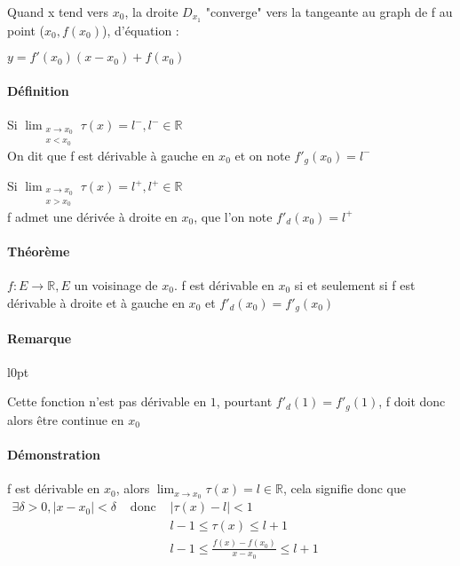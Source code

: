 Quand x tend vers $x_0$, la droite $D_{x_1}$  "converge" vers la tangeante au graph de f au point ($x_0, f(x_0)$), d'équation :

$y = f'(x_0)(x-x_0)+f(x_0)$

\paragraph{Définition}
Si $\lim_{\substack{x \to x_0 \\ x < x_0}} \tau (x) = l^-, l^- \in \mathbb{R}$~\\
On dit que f est dérivable à gauche en $x_0$ et on note $f'_g(x_0) = l^-$

Si $\lim_{\substack{x \to x_0 \\ x > x_0}} \tau (x) = l^+, l^+ \in \mathbb{R}$~\\
f admet une dérivée à droite en $x_0$, que l'on note $f'_d(x_0) = l^+$

\paragraph{Théorème} $f:E \rightarrow \mathbb{R}, E$ un voisinage de $x_0$. f est dérivable en $x_0$ si et seulement si f est dérivable à droite et à gauche en $x_0$ et $f'_d(x_0) = f'_g(x_0)$

\paragraph{Remarque}
\begin{wrapfigure}[3]{l}{0pt}
\end{wrapfigure}
Cette fonction n'est pas dérivable en $1$, pourtant $f'_d(1) = f'_g(1)$, f doit donc alors être continue en $x_0$

\paragraph{Démonstration} f est dérivable en $x_0$, alors $\lim_{x \to x_0} \tau (x) = l \in \mathbb{R}$, cela signifie donc que $\begin{array} {rcl}
	\exists \delta > 0, |x-x_0| < \delta &\text{ donc }& |\tau (x) - l| < 1 \\
																						 & & l-1 \leq \tau (x) \leq l+1 \\
																				   & & l-1 \leq \frac{f(x) - f(x_0)}{x-x_0} \leq l+1 \end{array}$


